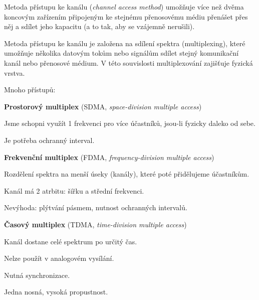 \begin{compactitem}
    \item Metoda přístupu ke kanálu (\textit{channel access method}) umožňuje více než dvěma koncovým zařízením připojeným ke stejnému přenosovému médiu přenášet přes něj a sdílet jeho kapacitu (a to tak, aby se vzájemně nerušili).

    \item Metoda přístupu ke kanálu je založena na sdílení spektra (multiplexing), které umožňuje několika datovým tokům nebo signálům sdílet stejný komunikační kanál nebo přenosové médium. V této souvislosti multiplexování zajišťuje fyzická vrstva.

    \item Mnoho přístupů: \begin{compactenum}
        \item \textbf{Prostorový multiplex} (SDMA, \textit{space-division multiple access}) \begin{compactitem}
            \item Jsme schopni využít 1 frekvenci pro více účastníků, jsou-li fyzicky daleko od sebe.

            \item Je potřeba ochranný interval.
        \end{compactitem}

        \item \textbf{Frekvenční multiplex} (FDMA, \textit{frequency-division multiple access}) \begin{compactitem}
            \item Rozdělení spektra na menší úseky (kanály), které poté přidělujeme účastníkům.
            \item Kanál má 2 atrbitu: šířku a střední frekvenci.
            \item Nevýhoda: plýtvání pásmem, nutnost ochranných intervalů.
        \end{compactitem}

        \item \textbf{Časový multiplex} (TDMA, \textit{time-division multiple access}) \begin{compactitem}
            \item Kanál dostane celé spektrum po určitý čas.
            \item Nelze použít v analogovém vysílání.
            \item Nutná synchronizace.
            \item Jedna nosná, vysoká propustnost.
        \end{compactitem}


\end{compactenum}
\end{compactitem}
